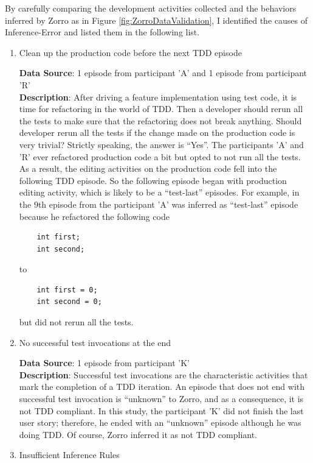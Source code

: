 By carefully comparing the development activities collected and the 
behaviors inferred by Zorro as in Figure \ref{fig:ZorroDataValidation},
I identified the causes of Inference-Error and listed them in the 
following list.
\begin{enumerate}
\item Clean up the production code before the next TDD episode

\textbf{Data Source}: 1 episode from participant 'A' and 1 episode from participant 'R'  \\
\textbf{Description}: After driving a feature implementation using test 
code, it is time for refactoring in the world of TDD. Then a developer 
should rerun all the tests to make sure that the refactoring does not 
break anything. Should developer rerun all the tests if the change made
on the production code is very trivial? Strictly speaking, the answer is
``Yes''. The participants 'A' and 'R' ever refactored production code 
a bit but opted to not run all the tests. As a result, the editing 
activities on the production code fell into the following TDD episode.
So the following episode began with production editing activity, which is
likely to be a ``test-last'' episodes. For example, in the 9th episode
from the participant 'A' was inferred as ``test-last'' episode because 
he refactored the following code 
\begin{verbatim}
    int first;
    int second;
\end{verbatim}
to 
\begin{verbatim}
    int first = 0;
    int second = 0;
\end{verbatim}
but did not rerun all the tests. 

\item No successful test invocations at the end

\textbf{Data Source}: 1 episode from participant 'K' \\ 
\textbf{Description}: Successful test invocations are the 
characteristic activities that mark the completion of a TDD iteration. 
An episode that does not end with successful test invocation is 
``unknown'' to Zorro, and as a consequence, it is not TDD 
compliant. In this study, the participant 'K' did not finish the 
last user story; therefore, he ended with an ``unknown'' episode 
although he was doing TDD. Of course, Zorro inferred it as
not TDD compliant.

\item Insufficient Inference Rules


\end{enumerate}

